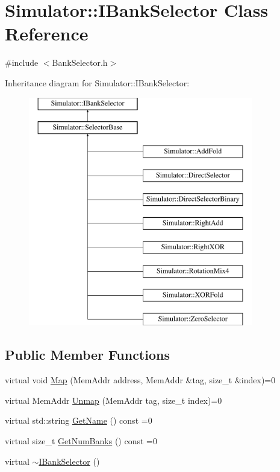 \hypertarget{class_simulator_1_1_i_bank_selector}{\section{Simulator\+:\+:I\+Bank\+Selector Class Reference}
\label{class_simulator_1_1_i_bank_selector}
}


{\ttfamily \#include $<$Bank\+Selector.\+h$>$}

Inheritance diagram for Simulator\+:\+:I\+Bank\+Selector\+:\begin{figure}[H]
\begin{center}
\leavevmode
\includegraphics[height=10.000000cm]{class_simulator_1_1_i_bank_selector}
\end{center}
\end{figure}
\subsection*{Public Member Functions}
\begin{DoxyCompactItemize}
\item 
virtual void \hyperlink{class_simulator_1_1_i_bank_selector_ad945160c483d88073b6e5572da5e4507}{Map} (Mem\+Addr address, Mem\+Addr \&tag, size\+\_\+t \&index)=0
\item 
virtual Mem\+Addr \hyperlink{class_simulator_1_1_i_bank_selector_a57c8b49e6439984ff40836e8c5992aba}{Unmap} (Mem\+Addr tag, size\+\_\+t index)=0
\item 
virtual std\+::string \hyperlink{class_simulator_1_1_i_bank_selector_afcc0edfb17b9390058a3732f8a8f9d67}{Get\+Name} () const =0
\item 
virtual size\+\_\+t \hyperlink{class_simulator_1_1_i_bank_selector_ac60b4a5485eff722861a1a0df7719340}{Get\+Num\+Banks} () const =0
\item 
virtual \hyperlink{class_simulator_1_1_i_bank_selector_a1c367af3c1f83c1aabc8bb72612efc90}{$\sim$\+I\+Bank\+Selector} ()
\end{DoxyCompactItemize}
